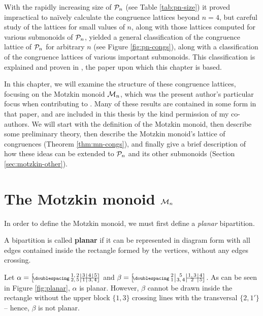 With the rapidly increasing size of $\mathcal{P}_n$ (see Table \ref{tab:pn-size}) it
proved impractical to na\"ively calculate the congruence lattices beyond $n=4$,
but careful study of the lattices for small values of $n$, along with those
lattices computed for various submonoids of $\mathcal{P}_n$, yielded a general
classification of the congruence lattice of $\mathcal{P}_n$ for arbitrary $n$ (see
Figure \ref{fig:pn-congs}), along with a classification of the congruence
lattices of various important submonoids.  This classification is explained and
proven in \cite{ourpaper}, the paper upon which this chapter is based.

In this chapter, we will examine the structure of these congruence lattices,
focusing on the Motzkin monoid $\mathcal{M}_n$, which was the present
author's particular focus when contributing to \cite{ourpaper}.  Many of these
results are contained in some form in that paper, and are included in this
thesis by the kind permission of my co-authors.  We will start with the
definition of the Motzkin monoid, then describe some preliminary theory, then
describe the Motzkin monoid's lattice of congruences (Theorem
\ref{thm:mn-congs}), and finally give a brief description of how these ideas can
be extended to $\mathcal{P}_n$ and its other submonoids (Section
\ref{sec:motzkin-other}).

\section{The Motzkin monoid $\mathcal{M}_n$}
\label{sec:motzkin-monoid}
In order to define the Motzkin monoid, we must first define a \textit{planar}
bipartition.

\begin{definition}
  \label{def:planar}
  A bipartition is called \textbf{planar} if it can be represented in diagram
  form with all edges contained inside the rectangle formed by the vertices,
  without any edges crossing.
\end{definition}

\begin{example}
  Let $\alpha = \bipart{c|c|c|c}{2-4}{1,2 &3 &4 &5}{2,5 &1 &\mc2{c}{3,4}}$ and
  $\beta = \bipart{c|c|c|c}{3-4}{2 &5 &1,3 &4}{1 &3,4 &2 &5}$.  As can be seen
  in Figure \ref{fig:planar}, $\alpha$ is planar.  However, $\beta$ cannot be
  drawn inside the rectangle without the upper block $\{1,3\}$ crossing lines
  with the transversal $\{2, 1'\}$ -- hence, $\beta$ is not planar.
\end{example}

